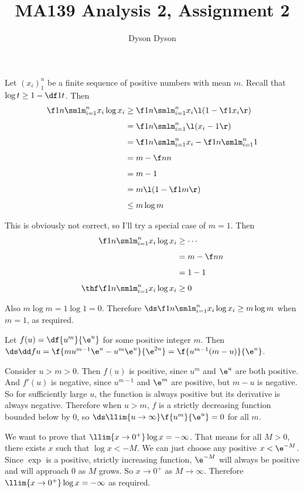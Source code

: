 \documentclass[a4paper]{article}
\title{MA139 Analysis 2, Assignment 2}
\author{Dyson Dyson}
\date{}
\begin{document}
\maketitle

\setlength{\parindent}{0em}
\setlength{\parskip}{1em}


Let $(x_i)_1^n$ be a finite sequence of positive numbers with mean $m$. Recall that $\log t \ge 1 - \df1t$. Then \begin{align*}
\f1n \smlm_{i=1}^n x_i \log x_i &\ge \f1n \smlm_{i=1}^n x_i \l(1 - \f1{x_i}\r)\\[1ex]
&= \f1n \smlm_{i=1}^n \l(x_i - 1\r)\\[1ex]
&= \f1n \smlm_{i=1}^n x_i - \f1n \smlm_{i=1}^n 1\\[1ex]
&= m - \f nn\\[1ex]
&= m - 1\\[1ex]
&= m \l(1 - \f1m\r)\\[1ex]
&\le m \log m
\end{align*}

This is obviously not correct, so I'll try a special case of $m=1$. Then \begin{align*}
\f1n \smlm_{i=1}^n x_i \log x_i &\ge \cdots\\[1ex]
&= m - \f nn\\[1ex]
&= 1 - 1\\[1ex]
\thf \f1n \smlm_{i=1}^n x_i \log x_i &\ge 0
\end{align*}

Also $m \log m = 1 \log 1 = 0$. Therefore $\ds \f1n \smlm_{i=1}^n x_i \log x_i \ge m \log m$ when $m=1$, as required.


Let $f(u) = \df{u^m}{\e^u}$ for some positive integer $m$. Then $\ds \dd fu = \f{m u^{m-1} \e^u - u^m \e^u}{\e^{2u}} = \f{u^{m-1} (m - u)}{\e^u}$.

Consider $u > m > 0$. Then $f(u)$ is positive, since $u^m$ and $\e^u$ are both positive. And $f'(u)$ is negative, since $u^{m-1}$ and $\e^m$ are positive, but $m - u$ is negative. So for sufficiently large $u$, the function is always positive but its derivative is always negative. Therefore when $u > m$, $f$ is a strictly decreasing function bounded below by $0$, so $\ds \llim{u \to \infty} \f{u^m}{\e^u} = 0$ for all $m$.


We want to prove that $\llim{x \to 0^+} \log x = -\infty$. That means for all $M > 0$, there exists $x$ such that $\log x < -M$. We can just choose any positive $x < \e^{-M}$. Since $\exp$ is a positive, strictly increasing function, $\e^{-M}$ will always be positive and will approach 0 as $M$ grows. So $x \to 0^+$ as $M \to \infty$. Therefore $\llim{x \to 0^+} \log x = -\infty$ as required.
\end{document}
